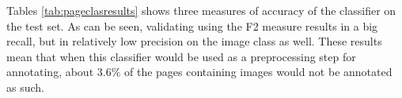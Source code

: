 Tables \ref{tab:pageclasresults} shows three measures of accuracy of the
classifier on the test set. As can be seen, validating using the F2 measure
results in a big recall, but in relatively low precision on the image
class as well. These results mean that when this classifier would be used as a
preprocessing step for annotating, about $3.6\%$ of the pages containing images
would not be annotated as such. 
